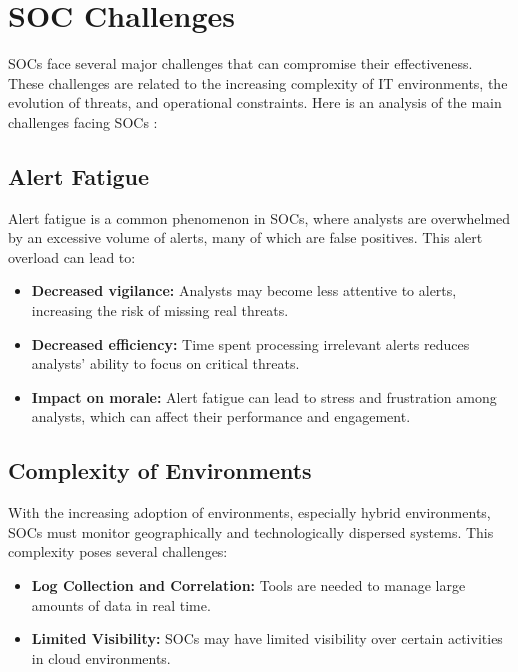 \section{SOC Challenges}
\label{sec:challenges}

SOCs face several major challenges that can compromise their effectiveness. These challenges are related to the increasing complexity of IT environments, the evolution of threats, and operational constraints. Here is an analysis of the main challenges facing SOCs \cite{ref38} \cite{ref39}:

\subsection{Alert Fatigue}
\label{subsec:alert-fatigue}

Alert fatigue is a common phenomenon in SOCs, where analysts are overwhelmed by an excessive volume of alerts, many of which are false positives. This alert overload can lead to:

\begin{itemize}
    \item \textbf{Decreased vigilance:} Analysts may become less attentive to alerts, increasing the risk of missing real threats.
    \item \textbf{Decreased efficiency:} Time spent processing irrelevant alerts reduces analysts' ability to focus on critical threats.
    \item \textbf{Impact on morale:} Alert fatigue can lead to stress and frustration among analysts, which can affect their performance and engagement.
\end{itemize}

\subsection{Complexity of Environments}
\label{subsec:complexity}

With the increasing adoption of environments, especially hybrid environments, SOCs must monitor geographically and technologically dispersed systems. This complexity poses several challenges:

\begin{itemize}
    \item \textbf{Log Collection and Correlation:} Tools are needed to manage large amounts of data in real time.
    \item \textbf{Limited Visibility:} SOCs may have limited visibility over certain activities in cloud environments.
\end{itemize}

